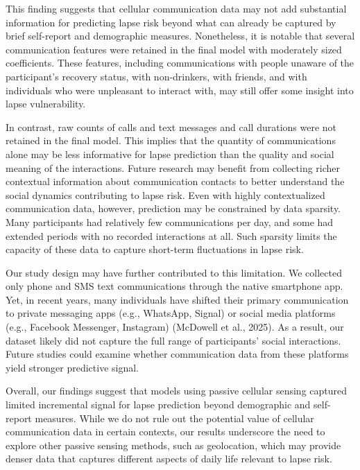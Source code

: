 \documentclass[
  letterpaper,
  DIV=11,
  numbers=noendperiod]{scrartcl}
\begin{document}
This finding suggests that cellular communication data may not add
substantial information for predicting lapse risk beyond what can
already be captured by brief self-report and demographic measures.
Nonetheless, it is notable that several communication features were
retained in the final model with moderately sized coefficients. These
features, including communications with people unaware of the
participant's recovery status, with non-drinkers, with friends, and with
individuals who were unpleasant to interact with, may still offer some
insight into lapse vulnerability.

In contrast, raw counts of calls and text messages and call durations
were not retained in the final model. This implies that the quantity of
communications alone may be less informative for lapse prediction than
the quality and social meaning of the interactions. Future research may
benefit from collecting richer contextual information about
communication contacts to better understand the social dynamics
contributing to lapse risk. Even with highly contextualized
communication data, however, prediction may be constrained by data
sparsity. Many participants had relatively few communications per day,
and some had extended periods with no recorded interactions at all. Such
sparsity limits the capacity of these data to capture short-term
fluctuations in lapse risk.

Our study design may have further contributed to this limitation. We
collected only phone and SMS text communications through the native
smartphone app. Yet, in recent years, many individuals have shifted
their primary communication to private messaging apps (e.g., WhatsApp,
Signal) or social media platforms (e.g., Facebook Messenger, Instagram)
(McDowell et al., 2025). As a result, our dataset likely did not capture
the full range of participants' social interactions. Future studies
could examine whether communication data from these platforms yield
stronger predictive signal.

Overall, our findings suggest that models using passive cellular sensing
captured limited incremental signal for lapse prediction beyond
demographic and self-report measures. While we do not rule out the
potential value of cellular communication data in certain contexts, our
results underscore the need to explore other passive sensing methods,
such as geolocation, which may provide denser data that captures
different aspects of daily life relevant to lapse risk.

\newpage
\end{document}

